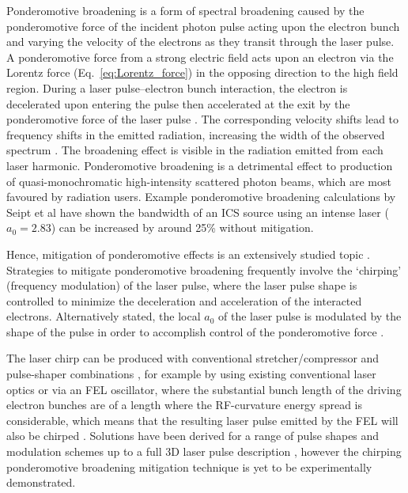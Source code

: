 \documentclass[../main.tex]{subfiles}
\begin{document}
Ponderomotive broadening is a form of spectral broadening caused by the ponderomotive force of the incident photon pulse acting upon the electron bunch and varying the velocity of the electrons as they transit through the laser pulse. A ponderomotive force from a strong electric field acts upon an electron via the Lorentz force (Eq.~\ref{eq:Lorentz_force}) in the opposing direction to the high field region. During a laser pulse--electron bunch interaction, the electron is decelerated upon entering the pulse then accelerated at the exit by the ponderomotive force of the laser pulse \cite{krafft2004spectral}. The corresponding velocity shifts lead to frequency shifts in the
emitted radiation, increasing the width of the observed
spectrum \cite{krafft2004spectral}. The broadening effect is visible in the radiation emitted from each laser harmonic. Ponderomotive broadening is a detrimental effect to production of quasi-monochromatic high-intensity scattered photon beams, which are most favoured by radiation users. Example ponderomotive broadening calculations by Seipt et al have shown the bandwidth of an ICS source using an intense laser ($a_{0} = 2.83$) can be increased by around 25\% without mitigation. 

Hence, mitigation of ponderomotive effects is an extensively studied topic \cite{ghebregziabher2013spectral,terzic2014narrow,seipt2015narrowband,rykovanov2016controlling,terzic2016combining,terzic2019improving}. Strategies to mitigate ponderomotive broadening frequently involve the `chirping' (frequency modulation) of the laser pulse, where the laser pulse shape is controlled to minimize the deceleration and acceleration of the interacted electrons. Alternatively stated, the local $a_{0}$ of the laser pulse is modulated by the shape of the pulse in order to accomplish control of the ponderomotive force \cite{terzic2019improving}.  

The laser chirp can be produced with conventional stretcher/compressor and pulse-shaper combinations \cite{ghebregziabher2013spectral}, for example by using existing conventional laser optics or via an FEL oscillator, where the substantial bunch length of the driving electron bunches are of a length where the RF-curvature energy spread is considerable, which means that the resulting laser pulse emitted by the FEL will also be chirped \cite{terzic2014narrow}. Solutions have been derived for a range of pulse shapes and modulation schemes up to a full 3D laser pulse description \cite{terzic2019improving}, however the chirping ponderomotive broadening mitigation technique is yet to be experimentally demonstrated.
\end{document}
